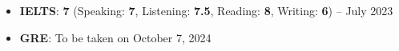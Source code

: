 
\vspace{10pt}
\begin{itemize}
  \shorthandoff{:}
  \item \textbf{IELTS}: \textbf{7} (Speaking: \textbf{7}, Listening: \textbf{7.5}, Reading: \textbf{8}, Writing: \textbf{6}) --  July 2023
  \item \textbf{GRE}: To be taken on October 7, 2024
  \shorthandon{:}
\end{itemize}

